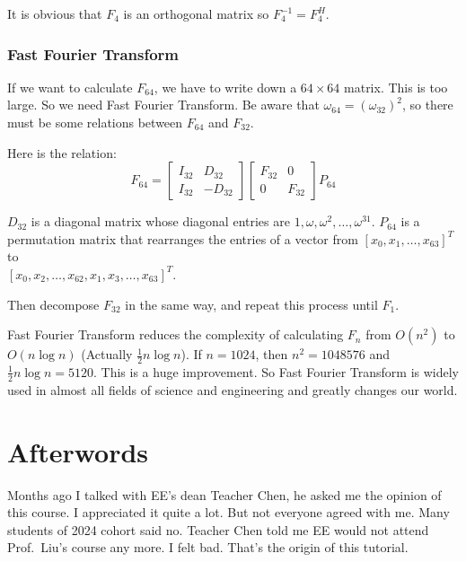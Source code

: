 \documentclass[10pt,a4paper,oneside,numbers=noenddot]{scrbook}
\theoremstyle{ctplain}
\theoremstyle{ctresult}
\begin{document}
It is obvious that $F_4$ is an orthogonal matrix so $F_4^{-1} = F_4^{H}$.

\subsection{Fast Fourier Transform}

If we want to calculate $F_{64}$, we have to write down a $64 \times 64$ matrix. This is
too large. So we need Fast Fourier Transform. Be aware that $\omega_{64} = (\omega_{32})^2$,
so there must be some relations between $F_{64}$ and $F_{32}$.

Here is the relation:
\[
  F_{64} = \begin{bmatrix}
    I_{32} & D_{32} \\
    I_{32} & -D_{32}
  \end{bmatrix}
  \begin{bmatrix}
    F_{32} & 0 \\
    0 & F_{32}
  \end{bmatrix}
  P_{64}
\]

$D_{32}$ is a diagonal matrix whose diagonal entries are $1, \omega, \omega^2,
\ldots, \omega^{31}$. $P_{64}$ is a permutation matrix that rearranges the entries of
a vector from $[x_0, x_1, \ldots, x_{63}]^T$ to \\
$[x_0, x_2, \ldots, x_{62}, x_1, x_3, \ldots, x_{63}]^T$.

Then decompose $F_{32}$ in the same way, and repeat this process until $F_1$.

Fast Fourier Transform reduces the complexity of calculating $F_n$ from $O(n^2)$ to
$O(n \log n)$ (Actually $\frac12 n \log n$). If $n = 1024$, then $n^2 = 1048576$ and
$\frac12 n \log n = 5120$. This is a huge improvement. So Fast Fourier Transform is widely
used in almost all fields of science and engineering and greatly changes our world.

\newpage
\chapter*{Afterwords}

\linespread{1.55}\selectfont

Months ago I talked with EE's dean Teacher Chen, he asked me the opinion of
this course. I appreciated it quite a lot. But not everyone agreed with me. Many students
of 2024 cohort said no. Teacher Chen told me EE would not attend Prof.\ Liu's course any more.
I felt bad. That's the origin of this tutorial.
\end{document}
